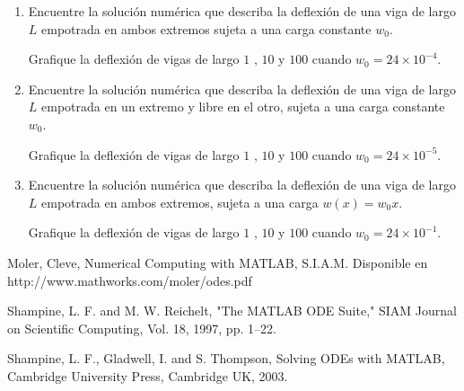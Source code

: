 \documentclass[11pt]{article}
\begin{document}
\begin{enumerate}
\begin{enumerate}
\item
Encuentre la soluci\'on num\'erica que describa la deflexi\'on de una viga de largo $L$ empotrada en ambos extremos sujeta a una carga constante $w_0$.

Grafique la deflexi\'on de vigas de largo $1$ , $10$ y $100$ cuando $w_0=24\times 10^{-4}$.

\item 
Encuentre la soluci\'on num\'erica que describa la deflexi\'on de una viga de largo $L$ empotrada en un extremo y libre en el otro, sujeta a una carga constante $w_0$.

Grafique la deflexi\'on de vigas de largo $1$ , $10$ y $100$ cuando $w_0=24\times 10^{-5}$.

\item 
Encuentre la soluci\'on num\'erica que describa la deflexi\'on de una viga de largo $L$ empotrada en ambos extremos, sujeta a una carga $w(x)=w_0 x$.

Grafique la deflexi\'on de vigas de largo $1$ , $10$ y $100$ cuando $w_0=24\times 10^{-1}$.
\end{enumerate}


\end{enumerate}
\begin{thebibliography}{9}
 Moler, Cleve, Numerical Computing with MATLAB, S.I.A.M. Disponible en http://www.mathworks.com/moler/odes.pdf

 Shampine, L. F. and M. W. Reichelt, "The MATLAB ODE Suite," SIAM Journal on Scientific Computing, Vol. 18, 1997, pp. 1–22.

 Shampine, L. F., Gladwell, I. and S. Thompson, Solving ODEs with MATLAB, Cambridge University Press, Cambridge UK, 2003.




\end{thebibliography}
\end{document}

